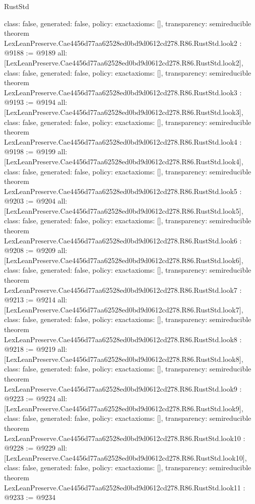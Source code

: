 \begin{lexlean}{RustStd}
\begin{coremodule}
{  class: false,
  generated: false,
  policy: exact{axioms: []},
  transparency: semireducible
}
theorem LexLeanPreserve.Cae4456d77aa62528ed0bd9d0612cd278.R86.RustStd.look2 : @9188 := @9189 {
  all: [LexLeanPreserve.Cae4456d77aa62528ed0bd9d0612cd278.R86.RustStd.look2],
  class: false,
  generated: false,
  policy: exact{axioms: []},
  transparency: semireducible
}
theorem LexLeanPreserve.Cae4456d77aa62528ed0bd9d0612cd278.R86.RustStd.look3 : @9193 := @9194 {
  all: [LexLeanPreserve.Cae4456d77aa62528ed0bd9d0612cd278.R86.RustStd.look3],
  class: false,
  generated: false,
  policy: exact{axioms: []},
  transparency: semireducible
}
theorem LexLeanPreserve.Cae4456d77aa62528ed0bd9d0612cd278.R86.RustStd.look4 : @9198 := @9199 {
  all: [LexLeanPreserve.Cae4456d77aa62528ed0bd9d0612cd278.R86.RustStd.look4],
  class: false,
  generated: false,
  policy: exact{axioms: []},
  transparency: semireducible
}
theorem LexLeanPreserve.Cae4456d77aa62528ed0bd9d0612cd278.R86.RustStd.look5 : @9203 := @9204 {
  all: [LexLeanPreserve.Cae4456d77aa62528ed0bd9d0612cd278.R86.RustStd.look5],
  class: false,
  generated: false,
  policy: exact{axioms: []},
  transparency: semireducible
}
theorem LexLeanPreserve.Cae4456d77aa62528ed0bd9d0612cd278.R86.RustStd.look6 : @9208 := @9209 {
  all: [LexLeanPreserve.Cae4456d77aa62528ed0bd9d0612cd278.R86.RustStd.look6],
  class: false,
  generated: false,
  policy: exact{axioms: []},
  transparency: semireducible
}
theorem LexLeanPreserve.Cae4456d77aa62528ed0bd9d0612cd278.R86.RustStd.look7 : @9213 := @9214 {
  all: [LexLeanPreserve.Cae4456d77aa62528ed0bd9d0612cd278.R86.RustStd.look7],
  class: false,
  generated: false,
  policy: exact{axioms: []},
  transparency: semireducible
}
theorem LexLeanPreserve.Cae4456d77aa62528ed0bd9d0612cd278.R86.RustStd.look8 : @9218 := @9219 {
  all: [LexLeanPreserve.Cae4456d77aa62528ed0bd9d0612cd278.R86.RustStd.look8],
  class: false,
  generated: false,
  policy: exact{axioms: []},
  transparency: semireducible
}
theorem LexLeanPreserve.Cae4456d77aa62528ed0bd9d0612cd278.R86.RustStd.look9 : @9223 := @9224 {
  all: [LexLeanPreserve.Cae4456d77aa62528ed0bd9d0612cd278.R86.RustStd.look9],
  class: false,
  generated: false,
  policy: exact{axioms: []},
  transparency: semireducible
}
theorem LexLeanPreserve.Cae4456d77aa62528ed0bd9d0612cd278.R86.RustStd.look10 : @9228 := @9229 {
  all: [LexLeanPreserve.Cae4456d77aa62528ed0bd9d0612cd278.R86.RustStd.look10],
  class: false,
  generated: false,
  policy: exact{axioms: []},
  transparency: semireducible
}
theorem LexLeanPreserve.Cae4456d77aa62528ed0bd9d0612cd278.R86.RustStd.look11 : @9233 := @9234 {
}
\end{coremodule}
\end{lexlean}
